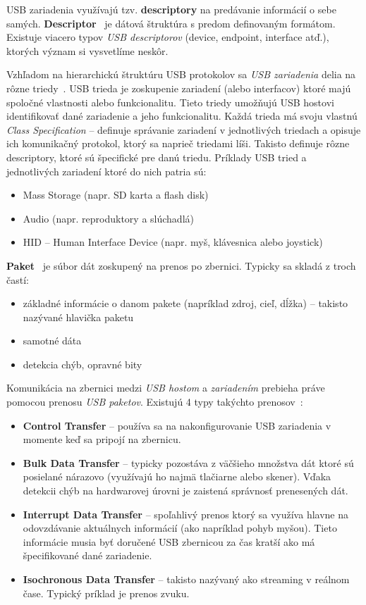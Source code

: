 USB zariadenia využívajú tzv. \textbf{descriptory} na predávanie informácií o sebe samých. \textbf{Descriptor}~\cite{usb_descriptor} je dátová štruktúra s predom definovaným formátom. Existuje viacero typov \textit{USB descriptorov} (device, endpoint, interface atď.), ktorých význam si vysvetlíme neskôr.

Vzhľadom na hierarchickú štruktúru USB protokolov sa \textit{USB zariadenia} delia na rôzne triedy~\cite{usb_classes}. USB trieda je zoskupenie zariadení (alebo interfacov) ktoré majú spoločné vlastnosti alebo funkcionalitu. Tieto triedy umožňujú USB hostovi identifikovať dané zariadenie a jeho funkcionalitu. Každá trieda má svoju vlastnú \textit{Class Specification} -- definuje správanie zariadení v jednotlivých triedach a opisuje ich komunikačný protokol, ktorý sa naprieč triedami líši. Takisto definuje rôzne descriptory, ktoré sú špecifické pre danú triedu. Príklady USB tried a jednotlivých zariadení ktoré do nich patria sú:
\begin{itemize}
\item Mass Storage (napr. SD karta a flash disk)
\item Audio (napr. reproduktory a slúchadlá)
\item HID -- Human Interface Device (napr. myš, klávesnica alebo joystick)
\end{itemize}

\textbf{Paket}~\cite{usb_packet} je súbor dát zoskupený na prenos po zbernici. Typicky sa skladá z troch častí:
\begin{itemize}
\item základné informácie o danom pakete (napríklad zdroj, cieľ, dĺžka) -- takisto nazývané hlavička paketu
\item samotné dáta
\item detekcia chýb, opravné bity
\end{itemize}

Komunikácia na zbernici medzi \textit{USB hostom} a \textit{zariadením} prebieha práve pomocou prenosu \textit{USB paketov}.   Existujú 4 typy takýchto prenosov~\cite{usb_type_transfers}:
\begin{itemize}
\item \textbf{Control Transfer} -- používa sa na nakonfigurovanie USB zariadenia v momente keď sa pripojí na zbernicu.
\item \textbf{Bulk Data Transfer} -- typicky pozostáva z väčšieho množstva dát ktoré sú posielané nárazovo (využívajú ho najmä tlačiarne alebo skener). Vďaka detekcii chýb na hardwarovej úrovni je zaistená správnosť prenesených dát.
\item \textbf{Interrupt Data Transfer} -- spoľahlivý prenos ktorý sa využíva hlavne na odovzdávanie aktuálnych informácií (ako napríklad pohyb myšou). Tieto informácie musia byť doručené USB zbernicou za čas kratší ako má špecifikované dané zariadenie.
\item \textbf{Isochronous Data Transfer} -- takisto nazývaný ako streaming v reálnom čase. Typický príklad je prenos zvuku.
\end{itemize}


